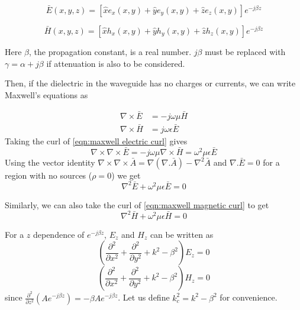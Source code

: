 \begin{equation}
\bar{E}(x,y,z)=[\hat{x}e_x(x,y)+\hat{y}e_y(x,y)+\hat{z}e_z(x,y)]e^{-j\beta z}
\label{eqn:electric field general}
\end{equation}

\begin{equation}
\bar{H}(x,y,z)=[\hat{x}h_x(x,y)+\hat{y}h_y(x,y)+\hat{z}h_z(x,y)]e^{-j\beta z}
\label{eqn:magnetic field general}
\end{equation}

Here $\beta$, the propagation constant, is a real number. $j\beta$ must be replaced with $\gamma=\alpha+j\beta$ if attenuation is also to be considered.

Then, if the dielectric in the waveguide has no charges or currents, we can write Maxwell's equations as

\begin{subequations}
\label{eqn:maxwell curl}
\begin{align}
\nabla \times \bar{E}& =-j\omega \mu \bar{H}
\label{eqn:maxwell electric curl}\\
\nabla \times \bar{H}& =j\omega \epsilon \bar{E}
\label{eqn:maxwell magnetic curl}
\end{align}
\end{subequations}
Taking the curl of \ref{eqn:maxwell electric curl} gives
\begin{equation}
\nabla \times \nabla \times \bar{E}=-j\omega\mu \nabla \times \bar{H}=\omega^2 \mu\epsilon \bar{E}
\end{equation}
Using the vector identity $\nabla\times\nabla\times\bar{A}=\nabla(\nabla .\bar{A})-\nabla^2 \bar{A}$ and $\nabla .\bar{E}=0$ for a region with no sources ($\rho=0$) we get
\begin{equation}
\nabla^2 \bar{E}+\omega^2\mu\epsilon\bar{E}=0
\end{equation}

Similarly, we can also take the curl of \ref{eqn:maxwell magnetic curl} to get
\begin{equation}
\nabla^2 \bar{H}+\omega^2\mu\epsilon\bar{H}=0
\end{equation}

For a $z$ dependence of $e^{-j\beta z}$, $E_z$ and $H_z$ can be written as
\begin{equation}
\left(\frac{\partial^2}{\partial x^2}+\frac{\partial^2}{\partial y^2}+k^2-\beta^2\right)E_z=0
\label{eqn:diff Ez}
\end{equation}
\begin{equation}
\left(\frac{\partial^2}{\partial x^2}+\frac{\partial^2}{\partial y^2}+k^2-\beta^2\right)H_z=0
\label{eqn:diff Hz}
\end{equation}
since $\frac{\partial^2}{\partial z^2}\left(Ae^{-j\beta z}\right)=-\beta Ae^{-j\beta z}$.
Let us define $k_c^2=k^2-\beta^2$ for convenience.

